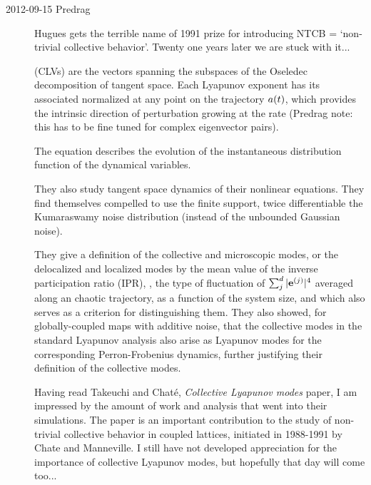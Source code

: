 \begin{description}
\item[2012-09-15 Predrag]
Hugues gets the terrible name of 1991 prize for
introducing NTCB = `non-trivial collective behavior'. Twenty one years later
we are stuck with it...

                                                    \inCB
{\CLvs} (CLVs) are the vectors spanning the subspaces
of the Oseledec decomposition of tangent space. Each Lyapunov exponent
\eigExp[j] has its associated normalized {\cLv} \jEigvec[j] at any point on
the trajectory $\ssp(t)$, which provides the intrinsic direction of
perturbation growing at the rate \eigExp[j] (Predrag note: this has to be
fine tuned for complex eigenvector pairs).

                                                    \toCB
The {\FP} equation describes the evolution of the instantaneous
distribution function of the dynamical variables.

They also study tangent space dynamics of their nonlinear {\FP}
equations. They find themselves compelled to use the finite support,
twice differentiable the Kumaraswamy noise distribution (instead of the
unbounded Gaussian noise).

They give a definition of the collective and microscopic modes, or the
delocalized and localized modes by the mean value of the inverse
participation ratio (IPR), \ie, the type of fluctuation of $\sum_j^d
|\jEigvec[j]|^4$ averaged along an chaotic trajectory, as a function of the
system size, and which also serves as a criterion for distinguishing
them. They also showed, for globally-coupled maps with additive noise,
that the collective modes in the standard Lyapunov analysis also arise as
Lyapunov modes for the corresponding Perron-Frobenius dynamics, further
justifying their definition of the collective modes.

Having read Takeuchi and Chat\'{e},
\emph{Collective {Lyapunov} modes} paper,
I am impressed by the amount of work and analysis that went into their
simulations. The paper is an important contribution to the study of
non-trivial collective behavior in coupled lattices, initiated in
1988-1991 by Chate and Manneville.
I still have not developed appreciation for the importance of
collective Lyapunov modes, but hopefully that day will come too...


\end{description}
